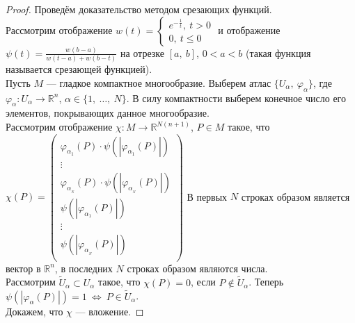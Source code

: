 \documentclass[12pt]{article}
\theoremstyle{plain}
\newcommand{\R}{\mathbb R}
\renewcommand{\phi}{\varphi}
\begin{document}
    \begin{proof}
        Проведём доказательство методом срезающих функций.\\
        Рассмотрим отображение $w(t)=\begin{cases}
            e^{-\frac{1}{t}}, \ t>0\\
            0, \ t\leqslant 0
        \end{cases}$ и отображение $\psi(t)=\frac{w(b-a)}{w(t-a)+w(b-t)}$ на отрезке $[a, \ b]$, $0<a<b$ (такая функция называется срезающей функцией).\\
        Пусть $M$ --- гладкое компактное многообразие. Выберем атлас $\{U_{\alpha}, \ \phi_{\alpha}\}$, где $\phi_{\alpha}:U_{\alpha}\to\R^n$, $\alpha\in\{1, \ \ldots, \ N\}$. В силу компактности выберем конечное число его элементов, покрывающих данное многообразие.\\
        Рассмотрим отображение $\chi:M\to\R^{N(n+1)}$, $P\in M$ такое, что $\chi(P)=\begin{pmatrix}
            \phi_{\alpha_1}(P)\cdot\psi(|\phi_{\alpha_1}(P)|)\\
            \vdots\\
            \phi_{\alpha_{_N}}(P)\cdot\psi(|\phi_{\alpha_{_N}}(P)|)\\
            \psi(|\phi_{\alpha_1}(P)|)\\
            \vdots\\
            \psi(|\phi_{\alpha_{_N}}(P)|)\\
        \end{pmatrix}$
        В первых $N$ строках образом является вектор в $\R^n$, в последних $N$ строках образом являются числа.\\
        Рассмотрим $\tilde{U}_{\alpha}\subset U_{\alpha}$ такое, что $\chi(P)=0$, если $P\notin\tilde{U}_{\alpha}$. Теперь $\psi(|\phi_{\alpha}(P)|)=1 \ \Longleftrightarrow \ P\in\tilde{U}_{\alpha}$.\\
        Докажем, что $\chi$ --- вложение.
\end{proof}
\end{document}
